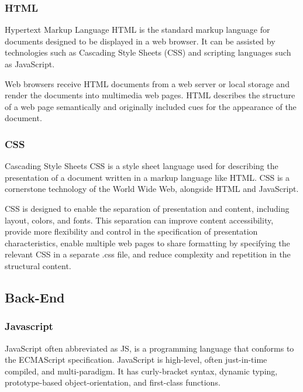 \subsubsection{HTML}
Hypertext Markup Language \ac{HTML} is the standard markup language for documents designed to be displayed in a web browser. It can be assisted by technologies such as Cascading Style Sheets (CSS) and scripting languages such as JavaScript.

Web browsers receive HTML documents from a web server or local storage and render the documents into multimedia web pages. HTML describes the structure of a web page semantically and originally included cues for the appearance of the document.



\subsubsection{CSS}
Cascading Style Sheets \ac{CSS} is a style sheet language used for describing the presentation of a document written in a markup language like HTML. CSS is a cornerstone technology of the World Wide Web, alongside HTML and JavaScript.

\ac{CSS} is designed to enable the separation of presentation and content, including layout, colors, and fonts. This separation can improve content accessibility, provide more flexibility and control in the specification of presentation characteristics, enable multiple web pages to share formatting by specifying the relevant CSS in a separate .css file, and reduce complexity and repetition in the structural content.


\subsection{Back-End}
\subsubsection{Javascript}
JavaScript often abbreviated as JS, is a programming language that conforms to the ECMAScript specification. JavaScript is high-level, often just-in-time compiled, and multi-paradigm. It has curly-bracket syntax, dynamic typing, prototype-based object-orientation, and first-class functions.







